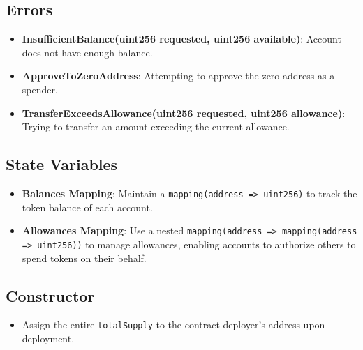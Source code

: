 \documentclass[12pt]{article}
\begin{document}
\subsection*{Errors}
\begin{itemize}
  \item \textbf{InsufficientBalance(uint256 requested, uint256 available)}: Account does not have enough balance.
  \item \textbf{ApproveToZeroAddress}: Attempting to approve the zero address as a spender.
  \item \textbf{TransferExceedsAllowance(uint256 requested, uint256 allowance)}: Trying to transfer an amount exceeding the current allowance.
\end{itemize}

\subsection*{State Variables}
\begin{itemize}
  \item \textbf{Balances Mapping}: Maintain a \texttt{mapping(address => uint256)} to track the token balance of each account.
  \item \textbf{Allowances Mapping}: Use a nested \texttt{mapping(address => mapping(address => uint256))} to manage allowances, enabling accounts to authorize others to spend tokens on their behalf.
\end{itemize}

\subsection*{Constructor}
\begin{itemize}
  \item Assign the entire \texttt{totalSupply} to the contract deployer's address upon deployment.
\end{itemize}
\end{document}
